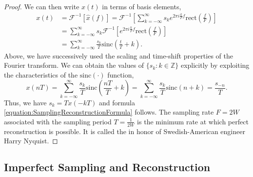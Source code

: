 \begin{proof}
We can then write $x(t)$ in terms of basis elements,
\begin{equation*}
\begin{split}
x(t) &= \mathcal{F}^{-1} \left[ \hat{x}(f) \right]
= \mathcal{F}^{-1} \left[ \sum_{k=-\infty}^{\infty} s_k e^{2 \pi i \frac{k}{F} f}
\mathrm{rect} \left( \frac{f}{F} \right) \right] \\
&= \sum_{k=-\infty}^{\infty} s_k \mathcal{F}^{-1} \left[ e^{2 \pi i \frac{k}{F} f}
\mathrm{rect} \left( \frac{f}{F} \right) \right] \\
&= \sum_{k=-\infty}^{\infty} \frac{s_k}{T} \mathrm{sinc} \left( \frac{t}{T} + k \right) .
\end{split}
\end{equation*}
Above, we have successively used the scaling and time-shift properties of the Fourier transform.
We can obtain the values of $\{ s_k : k \in \mathbb{Z} \}$ explicitly by exploiting the characteristics of the $\mathrm{sinc} (\cdot)$ function,
\begin{equation*}
x(nT)
= \sum_{k=-\infty}^{\infty}
\frac{s_k}{T} \mathrm{sinc} \left( \frac{nT}{T} + k \right)
= \sum_{k=-\infty}^{\infty}
\frac{s_k}{T} \mathrm{sinc} ( n + k ) = \frac{s_{-n}}{T} .
\end{equation*}
Thus, we have $s_{k} = T x(-kT)$ and formula \eqref{equation:SamplingReconstructionFormula} follows.
The sampling rate $F = 2W$ associated with the sampling period $T = \frac{1}{2W}$ is the minimum rate at which perfect reconstruction is possible.
It is called the  in honor of Swedish-American engineer Harry Nyquist.
\end{proof}


\subsection{Imperfect Sampling and Reconstruction}

